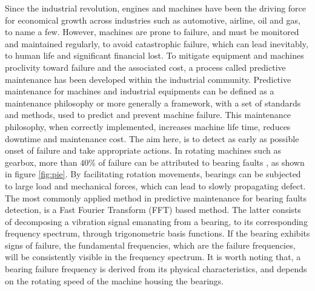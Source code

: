 \documentclass[../Main/thesis.tex]{subfiles}
\begin{document}
Since the industrial revolution, engines and machines have been the driving force for economical growth across industries such as automotive, airline, oil and gas, to name a few. However, machines are prone to failure, and must be monitored and maintained regularly, to avoid catastrophic failure, which can lead inevitably, to human life and significant financial lost. 
\justify
To mitigate equipment and machines proclivity toward failure and the associated cost, a process called predictive maintenance has been developed within the industrial community. Predictive maintenance  for machines and industrial equipments can be defined as a maintenance philosophy or more generally a framework, with a set of standards and methods, used to predict and prevent machine failure. This maintenance philosophy, when correctly implemented, increases machine life time, reduces downtime and maintenance cost. The aim here, is to detect as early as possible onset of failure and take appropriate actions.
\justify
In rotating machines such as gearbox, more than $40 \% $ of failure can be attributed to bearing faults \cite{albrecht1986}, as shown in figure \ref{fig:pie}. By facilitating rotation movements, bearings can be subjected to large load and mechanical forces, which can lead to slowly propagating defect. The most commonly applied method in predictive maintenance for bearing faults detection, is a Fast Fourier Transform (FFT) based method. The latter consists of decomposing a vibration signal emanating from a bearing, to its corresponding frequency spectrum, through trigonometric basis functions. If the bearing exhibits signs of failure, the fundamental frequencies, which are the failure frequencies, will be consistently visible in the frequency spectrum. It is worth noting that, a bearing failure frequency is derived from its physical characteristics, and depends on the rotating speed of the machine housing the bearings.
\end{document}
